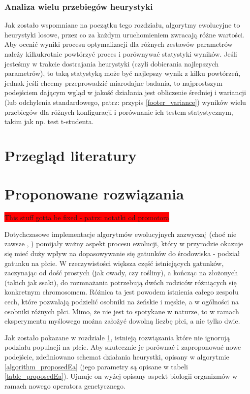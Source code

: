 \documentclass[twoside]{iisthesis}
\newcommand{\todo}{\colorbox{red}}
\begin{document}
\subsection{Analiza wielu przebiegów heurystyki}

Jak zostało wspomniane na początku tego rozdziału, algorytmy ewolucyjne to heurystyki losowe, przez co za każdym uruchomieniem zwracają różne wartości. Aby ocenić wyniki procesu optymalizacji dla różnych zestawów parametrów należy kilkukrotnie powtórzyć proces i porównywać statystyki wyników. Jeśli jesteśmy w trakcie dostrajania heurystyki (czyli dobierania najlepszych parametrów), to taką statystyką może być najlepszy wynik z kilku powtórzeń, jednak jeśli chcemy przeprowadzić miarodajne badania, to najprostszym podejściem dającym wgląd w jakość działania jest obliczenie średniej i wariancji (lub odchylenia standardowego, patrz: przypis \ref{footer_variance}) wyników wielu przebiegów dla różnych konfiguracji i porównanie ich testem statystycznym, takim jak np. test t-studenta.


\chapter{Przegląd literatury} \label{chapter_literature}
\chapter{Proponowane rozwiązania} \label{chapter_proposed}
\todo{This stuff gotta be fixed - patrz: notatki od promotora}

Dotychczasowe implementacje algorytmów ewolucyjnych zazwyczaj (choć nie zawsze \cite{GGA}, \cite{SexualGA}) pomijały ważny aspekt procesu ewolucji, który w przyrodzie okazuje się mieć duży wpływ na dopasowywanie się gatunków do środowiska - podział gatunku na płcie. W rzeczywistości większa część istniejących gatunków, zaczynając od dość prostych (jak owady, czy rośliny), a kończąc na złożonych (takich jak ssaki), do rozmnażania potrzebują dwóch rodziców różniących się konkretnym chromosomem. Różnica ta jest powodem istnienia całego zespołu cech, które pozwalają podzielić osobniki na żeńskie i męskie, a w ogólności na osobniki różnych płci. Mimo, że nie jest to spotykane w naturze, to w ramach eksperymentu myślowego można założyć dowolną liczbę płci, a nie tylko dwie.

Jak zostało pokazane w rozdziale \ref{chapter_literature}, istnieją rozwiązania które nie ignorują podziału populacji na płcie. Aby skutecznie je porównać i zaproponować nowe podejście, zdefiniowano schemat działania heurystki, opisany w algorytmie \ref{algorithm_proposedEa} (jego parametry są opisane w tabeli \ref{table_proposedEa}). Ujmuje on wyżej opisany aspekt biologii organizmów w ramach nowego operatora genetycznego.
\end{document}
